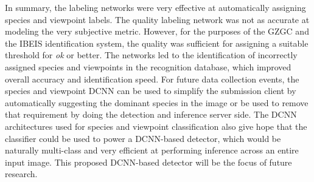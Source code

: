 In summary, the labeling networks were very effective at automatically assigning species and viewpoint labels.  The quality labeling network was not as accurate at modeling the very subjective metric.  However, for the purposes of the GZGC and the IBEIS identification system, the quality was sufficient for assigning a suitable threshold for \textit{ok} or better.  The networks led to the identification of incorrectly assigned species and viewpoints in the recognition database, which improved overall accuracy and identification speed.  For future data collection events, the species and viewpoint DCNN can be used to simplify the submission client by automatically suggesting the dominant species in the image or be used to remove that requirement by doing the detection and inference server side.  The DCNN architectures used for species and viewpoint classification also give hope that the classifier could be used to power a DCNN-based detector, which would be naturally multi-class and very efficient at performing inference across an entire input image.  This proposed DCNN-based detector will be the focus of future research.
